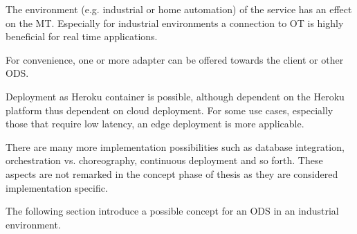 The environment (e.g. industrial or home automation) of the service has an effect on the MT. Especially for industrial environments a connection to OT is highly beneficial for real time applications. 

For convenience, one or more adapter can be offered towards the client or other ODS. 

Deployment as Heroku container is possible, although dependent on the Heroku platform thus dependent on cloud deployment. For some use cases, especially those that require low latency, an edge deployment is more applicable. 

There are many more implementation possibilities such as database integration, orchestration vs. choreography, continuous deployment and so forth. These aspects are not remarked in the concept phase of thesis as they are considered implementation specific.

The following section introduce a possible concept for an ODS in an industrial environment.